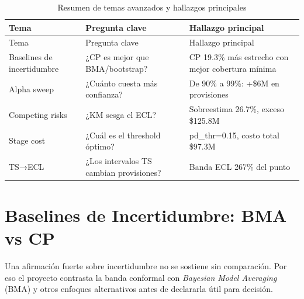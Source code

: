 \documentclass[
  spanish,
  11pt,
  letterpaper,
]{scrbook}
\theoremstyle{plain}
\theoremstyle{remark}
\begin{document}
\begin{longtable}[]{@{}
  >{\raggedright\arraybackslash}p{}
  >{\raggedright\arraybackslash}p{}
  >{\raggedright\arraybackslash}p{}@{}}
\caption{Resumen de temas avanzados y hallazgos
principales}\label{tbl-advanced-summary}\tabularnewline
\toprule\noalign{}
\begin{minipage}[b]{\linewidth}\raggedright
Tema
\end{minipage} & \begin{minipage}[b]{\linewidth}\raggedright
Pregunta clave
\end{minipage} & \begin{minipage}[b]{\linewidth}\raggedright
Hallazgo principal
\end{minipage} \\
\midrule\noalign{}
\endfirsthead
\toprule\noalign{}
\begin{minipage}[b]{\linewidth}\raggedright
Tema
\end{minipage} & \begin{minipage}[b]{\linewidth}\raggedright
Pregunta clave
\end{minipage} & \begin{minipage}[b]{\linewidth}\raggedright
Hallazgo principal
\end{minipage} \\
\midrule\noalign{}
\endhead
\bottomrule\noalign{}
\endlastfoot
Baselines de incertidumbre & ¿CP es mejor que BMA/bootstrap? & CP 19.3\%
más estrecho con mejor cobertura mínima \\
Alpha sweep & ¿Cuánto cuesta más confianza? & De 90\% a 99\%: +\$6M en
provisiones \\
Competing risks & ¿KM sesga el ECL? & Sobreestima 26.7\%, exceso
\$125.8M \\
Stage cost & ¿Cuál es el threshold óptimo? & pd\_thr=0.15, costo total
\$97.3M \\
TS→ECL & ¿Los intervalos TS cambian provisiones? & Banda ECL 267\% del
punto \\
\end{longtable}

\chapter{Baselines de Incertidumbre: BMA vs
CP}\label{sec-uncertainty-baselines}

Una afirmación fuerte sobre incertidumbre no se sostiene sin
comparación. Por eso el proyecto contrasta la banda conformal con
\emph{Bayesian Model Averaging} (BMA) y otros enfoques alternativos
antes de declararla útil para decisión.
\end{document}
